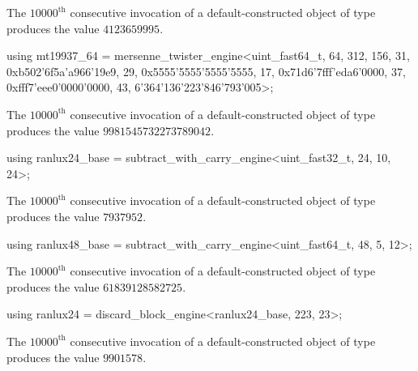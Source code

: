 \begin{itemdescr}
\pnum
\required
 The $10000^\text{th}$ consecutive invocation
 of a default-constructed object
 of type 
 produces the value $4123659995$.
\end{itemdescr}

%
\begin{itemdecl}
using mt19937_64 =
      mersenne_twister_engine<uint_fast64_t, 64, 312, 156, 31,
       0xb502'6f5a'a966'19e9, 29, 0x5555'5555'5555'5555, 17,
       0x71d6'7fff'eda6'0000, 37, 0xfff7'eee0'0000'0000, 43, 6'364'136'223'846'793'005>;
\end{itemdecl}

\begin{itemdescr}
\pnum
\required
 The $10000^\text{th}$ consecutive invocation
 of a default-constructed object
 of type 
 produces the value $9981545732273789042$.
\end{itemdescr}

%
\begin{itemdecl}
using ranlux24_base =
      subtract_with_carry_engine<uint_fast32_t, 24, 10, 24>;
\end{itemdecl}

\begin{itemdescr}
\pnum
\required
 The $10000^\text{th}$ consecutive invocation
 of a default-constructed object
 of type 
 produces the value
 $7937952$.
\end{itemdescr}

%
\begin{itemdecl}
using ranlux48_base =
      subtract_with_carry_engine<uint_fast64_t, 48, 5, 12>;
\end{itemdecl}

\begin{itemdescr}
\pnum
\required
 The $10000^\text{th}$ consecutive invocation
 of a default-constructed object
 of type 
 produces the value
 $61839128582725$.
\end{itemdescr}

%
\begin{itemdecl}
using ranlux24 = discard_block_engine<ranlux24_base, 223, 23>;
\end{itemdecl}

\begin{itemdescr}
\pnum
\required
 The $10000^\text{th}$ consecutive invocation
 of a default-constructed object
 of type 
 produces the value
 $9901578$.
\end{itemdescr}

